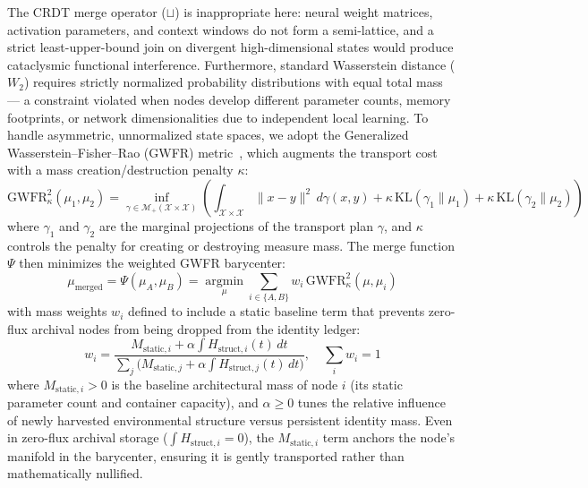 \documentclass[twocolumn, 10pt, journal, letterpaper]{IEEEtran}
\begin{document}
The CRDT merge operator ($\sqcup$) is inappropriate here: neural weight matrices, activation parameters, and context windows do not form a semi-lattice, and a strict least-upper-bound join on divergent high-dimensional states would produce cataclysmic functional interference. Furthermore, standard Wasserstein distance ($W_2$) requires strictly normalized probability distributions with equal total mass --- a constraint violated when nodes develop different parameter counts, memory footprints, or network dimensionalities due to independent local learning. To handle asymmetric, unnormalized state spaces, we adopt the Generalized Wasserstein--Fisher--Rao (GWFR) metric~\cite{villani2009}, which augments the transport cost with a mass creation/destruction penalty $\kappa$:
\begin{equation}
\text{GWFR}_{\kappa}^2(\mu_1, \mu_2) =
\inf_{\gamma \in \mathcal{M}_+(\mathcal{X} \times \mathcal{X})}
\left( \int_{\mathcal{X} \times \mathcal{X}} \|x - y\|^2 \, d\gamma(x,y)
+ \kappa \,\text{KL}(\gamma_1 \| \mu_1)
+ \kappa \,\text{KL}(\gamma_2 \| \mu_2) \right)
\label{eq:gwfr}
\end{equation}
where $\gamma_1$ and $\gamma_2$ are the marginal projections of the transport plan $\gamma$, and $\kappa$ controls the penalty for creating or destroying measure mass. The merge function $\Psi$ then minimizes the weighted GWFR barycenter:
\begin{equation}
\mu_{\text{merged}} = \Psi(\mu_A, \mu_B) = \operatorname*{argmin}_{\mu} \sum_{i \in \{A,B\}} w_i \, \text{GWFR}^2_{\kappa}(\mu, \mu_i)
\label{eq:gwfr_merge}
\end{equation}
with mass weights $w_i$ defined to include a static baseline term that prevents zero-flux archival nodes from being dropped from the identity ledger:
\begin{equation}
w_i = \frac{M_{\text{static},i} + \alpha \int H_{\text{struct},i}(t)\,dt}{\sum_j \big( M_{\text{static},j} + \alpha \int H_{\text{struct},j}(t)\,dt \big)}, \quad \sum_i w_i = 1
\label{eq:barycenter_weights}
\end{equation}
where $M_{\text{static},i} > 0$ is the baseline architectural mass of node $i$ (its static parameter count and container capacity), and $\alpha \ge 0$ tunes the relative influence of newly harvested environmental structure versus persistent identity mass. Even in zero-flux archival storage ($\int H_{\text{struct},i} = 0$), the $M_{\text{static},i}$ term anchors the node's manifold in the barycenter, ensuring it is gently transported rather than mathematically nullified.
\end{document}
